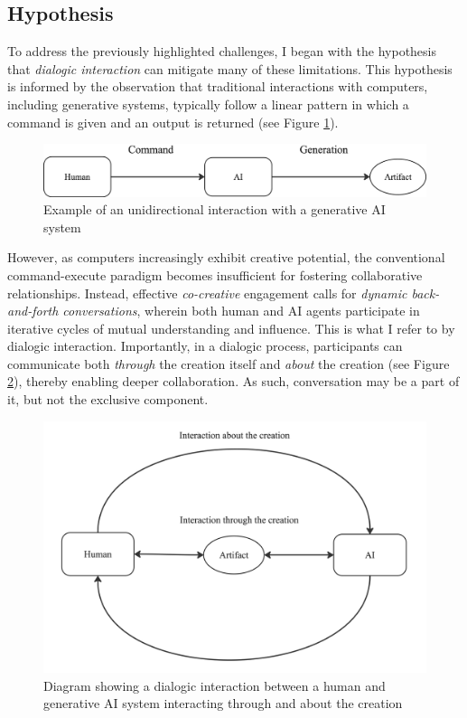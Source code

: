 \subsection{Hypothesis}

To address the previously highlighted challenges, I began with the hypothesis that \emph{dialogic interaction} can mitigate many of these limitations. This hypothesis is informed by the observation that traditional interactions with computers, including generative systems, typically follow a linear pattern in which a command is given and an output is returned (see Figure \ref{fig:unidirectional}). 

\begin{figure}[hbt!]
    \centering
    \includegraphics[width=0.75\linewidth]{unidirectional.png}
    \caption{Example of an unidirectional interaction with a generative AI system}
    \label{fig:unidirectional}
\end{figure}

However, as computers increasingly exhibit creative potential, the conventional command-execute paradigm becomes insufficient for fostering collaborative relationships. Instead, effective \emph{co-creative} engagement calls for \emph{dynamic back-and-forth conversations}, wherein both human and AI agents participate in iterative cycles of mutual understanding and influence. This is what I refer to by dialogic interaction. Importantly, in a dialogic process, participants can communicate both \emph{through} the creation itself and \emph{about} the creation (see Figure \ref{fig:dialogicthroughandabout}), thereby enabling deeper collaboration. As such, conversation may be a part of it, but not the exclusive component. 

\begin{figure}
    \centering
    \includegraphics[width=0.75\linewidth]{dialogicthroughandabout.jpg}
    \caption{Diagram showing a dialogic interaction between a human and generative AI system interacting through and about the creation}
    \label{fig:dialogicthroughandabout}
\end{figure}

